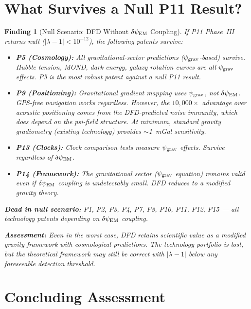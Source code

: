 \documentclass[11pt]{article}
\newtheorem{finding}{Finding}
\newcommand{\psigrav}{\psi_{\rm grav}}
\newcommand{\dpsiEM}{\delta\psi_{\rm EM}}
\newcommand{\lambdaone}{|\lambda{-}1|}
\begin{document}
\section{What Survives a Null P11 Result?}
\label{sec:null-scenario}

\begin{finding}[Null Scenario: DFD Without $\dpsiEM$ Coupling]
\label{find:null}
If P11 Phase~III returns null ($\lambdaone < 10^{-12}$), the following
patents survive:

\begin{itemize}[nosep]
\item \textbf{P5 (Cosmology):} All gravitational-sector predictions
  ($\psigrav$-based) survive. Hubble tension, MOND, dark energy, galaxy
  rotation curves are all $\psigrav$ effects. P5 is the most robust
  patent against a null P11 result.
\item \textbf{P9 (Positioning):} Gravitational gradient mapping uses
  $\psigrav$, not $\dpsiEM$. GPS-free navigation works regardless.
  However, the $10{,}000\times$ advantage over acoustic positioning
  comes from the DFD-predicted noise immunity, which \emph{does} depend
  on the psi-field structure. At minimum, standard gravity gradiometry
  (existing technology) provides $\sim$1~mGal sensitivity.
\item \textbf{P13 (Clocks):} Clock comparison tests measure $\psigrav$
  effects. Survive regardless of $\dpsiEM$.
\item \textbf{P14 (Framework):} The gravitational sector ($\psigrav$
  equation) remains valid even if $\dpsiEM$ coupling is undetectably
  small. DFD reduces to a modified gravity theory.
\end{itemize}

\textbf{Dead in null scenario:} P1, P2, P3, P4, P7, P8, P10, P11,
P12, P15 --- all technology patents depending on $\dpsiEM$ coupling.

\textbf{Assessment:} Even in the worst case, DFD retains scientific
value as a modified gravity framework with cosmological predictions.
The technology portfolio is lost, but the theoretical framework may
still be correct with $\lambdaone$ below any foreseeable detection
threshold.
\end{finding}


\section*{Concluding Assessment}
\end{document}
